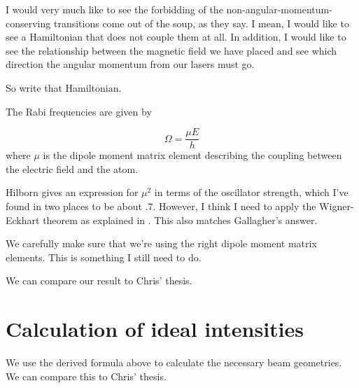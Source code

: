 

 I would very much like to see the forbidding of the non-angular-momentum-conserving transitions come out of the soup, as they say. I mean, I would like to see a Hamiltonian that does not couple them at all. In addition, I would like to see the relationship between the magnetic field we have placed and see which direction the angular momentum from our lasers must go. 


So write that Hamiltonian.  


The Rabi frequencies are given by 

\begin{equation}
\Omega=\frac{\mu E}{h}
\end{equation} \cite{hilbornNoGetConfused}
where $\mu$ is the dipole moment matrix element describing the coupling between the electric field and the atom. 

Hilborn gives an expression for $\mu^2$ in terms of the oscillator strength, which I've found in two places \cite{safronovaTheory} \cite{NISTasd} to be about .7. However, I think I need to apply the Wigner-Eckhart theorem as explained in \cite{demilleBudkerKimball}. This also matches Gallagher's answer. 

We carefully make sure that we're using the right dipole moment matrix elements. This is something I still need to do. 

We can compare our result to Chris' thesis. 


  \section{Calculation of ideal intensities}

We use the derived formula above to calculate the necessary beam geometries. We can compare this to Chris' thesis. 


